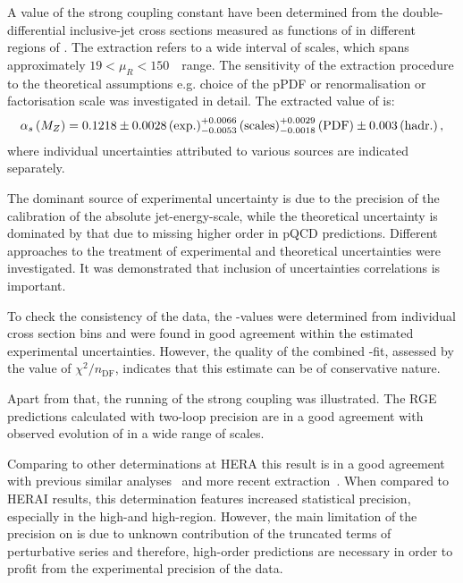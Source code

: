 A value of the strong coupling constant have been determined from the double-differential inclusive-jet cross sections measured as functions of \etjetb in different regions of \qsq. The extraction refers to a wide interval of scales, which spans approximately $19 < \mu_R < 150$~\GeV~range. The sensitivity of the extraction procedure to the theoretical assumptions e.g. choice of the pPDF or renormalisation or factorisation scale was investigated in detail. The extracted value of \asz is:
\begin{equation}
 \mbox{$\alpha_{s}\left(M_{Z}\right)$} = 0.1218 \pm 0.0028\left(\text{exp.}\right)^{+0.0066}_{-0.0053}\left(\text{scales}\right)^{+0.0029}_{-0.0018}\left(\text{PDF}\right)\pm{0.003}\left(\text{hadr.}\right),
\end{equation}
where individual uncertainties attributed to various sources are indicated separately. 

The dominant source of experimental uncertainty is due to the precision of the calibration of the absolute jet-energy-scale, while the theoretical uncertainty is dominated by that due to missing higher order in pQCD predictions.
Different approaches to the treatment of experimental and theoretical uncertainties were investigated. It was demonstrated that inclusion of uncertainties correlations is important. 

To check the consistency of the data, the \asz-values were determined from individual cross section bins and were found in good agreement within the estimated experimental uncertainties. However, the quality of the combined \as-fit, assessed by the value of $\chi^2/n_\text{DF}$, indicates that this estimate can be of conservative nature.

Apart from that, the running of the strong coupling was illustrated. The RGE predictions calculated with two-loop precision are in a good agreement with observed evolution of \as in a wide range of scales.
 
Comparing to other determinations at HERA this result is in a good agreement with previous similar analyses~\cite{HERAIjets} and more recent extraction~\cite{britzger}. When compared to HERAI results, this determination features increased statistical precision, especially in the high-\etjetb and high-\qsq region. However, the main limitation of the precision on \asz is due to unknown contribution of the truncated terms of perturbative series and therefore, high-order predictions are necessary in order to profit from the experimental precision of the data.